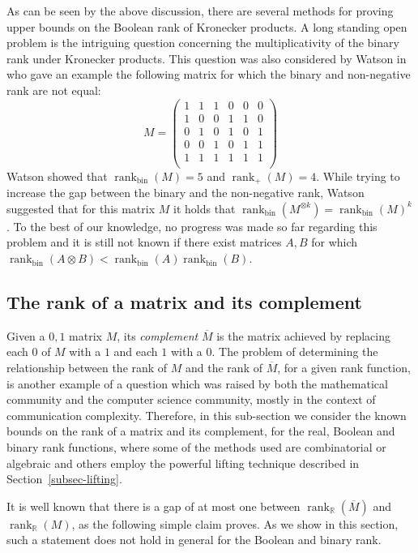 \documentclass[11pt]{article}
\newcommand{\rank}{\mathop{\mathrm{rank}}}
\newcommand{\Rbin}{{\rank}_{\mathrm{bin}}}
\newcommand{\Rreal}{{\rank}_\mathbb{R}}
\newcommand{\Rnon}{{\rank}_{+}}
\begin{document}
{{As can be seen by the above discussion, there are several methods for proving upper bounds on the Boolean rank of Kronecker products.
A  long standing open problem is the intriguing question  concerning the multiplicativity of the binary rank under Kronecker products.
This question was also considered by Watson in~\cite{watson2016nonnegative} who gave an example the following matrix for which the binary and non-negative rank are not equal:
$$M = \left(
  \begin{array}{cccccc}
    1 & 1 & 1 & 0 & 0 & 0 \\
    1 & 0 & 0 & 1 & 1 & 0 \\
    0 & 1 & 0 & 1 & 0 & 1 \\
    0 & 0 & 1 & 0 & 1 & 1 \\
    1 & 1 & 1 & 1 & 1 & 1 \\
  \end{array}
\right)
$$
Watson showed that $\Rbin(M) = 5$ and $\Rnon(M) = 4$.
While trying to increase the gap between the binary and the non-negative rank, Watson suggested that for this matrix $M$ it holds that
$\Rbin(M^{\otimes k}) = \Rbin(M)^k$.
To the best of our knowledge, no progress was made so far regarding this problem and it is still not known if
there exist matrices $A,B$ for which $\Rbin(A \otimes B) < \Rbin(A)\Rbin(B)$.


\subsection{The rank of a matrix and its complement}
\label{Subsec-complemement}

Given a $0,1$ matrix $M$, its {\em complement} $\overline{M}$ is the matrix achieved by replacing each $0$ of $M$ with a $1$ and each $1$ with a $0$.
The problem of determining the relationship between the rank of $M$ and the rank of $\overline{M}$, for a given rank function, is another example of a question which was
raised by both the mathematical community and the computer science community, mostly in the context of communication complexity.
Therefore, in this sub-section we consider the known bounds on the rank of a matrix and its complement, for the real, Boolean and binary rank functions,
where some of the methods used are combinatorial or algebraic and others employ the powerful lifting technique described in Section~\ref{subsec-lifting}.

It is well known that there is a gap of at most one between $\Rreal(\overline{M})$ and $\Rreal(M)$, as the following simple claim proves.
As we show in this section, such a statement does not hold in general for the Boolean and binary rank.

}}
\end{document}
